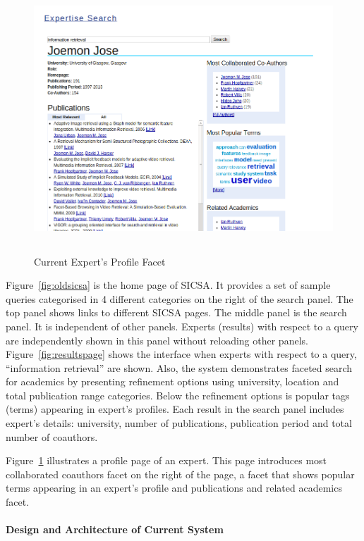  \begin{figure}
 \centering
 \includegraphics[width=13cm,height=10cm,keepaspectratio]{./figures/oldProfilePage.png}
 \caption{Current Expert's Profile Facet} \label{fig:profilepage} 
\end{figure}
Figure~\ref{fig:oldsicsa} is the home page of SICSA. It provides a set of sample queries categorised in 4 different categories on the right of the 
search panel. The top panel shows links to different SICSA pages. The middle panel is the search panel. It is independent of other panels. 
Experts (results) with respect to a query are independently shown in this panel without reloading other panels. Figure~\ref{fig:resultspage} shows
the interface when experts with respect to a query, ``information retrieval'' are shown. Also, the system demonstrates 
faceted search for academics by presenting refinement options using university, location and total publication range categories.
Below the refinement options is popular tags (terms) appearing in expert's profiles.
Each result in the search panel includes expert's details: university, number of publications, publication period and total number of coauthors.

Figure~\ref{fig:profilepage} illustrates a profile page of an expert. This page introduces most collaborated coauthors facet on the right of the page, a 
facet that shows popular terms appearing in an expert's profile and publications and related academics facet.

\paragraph{Design and Architecture of Current System} \hspace{0pt} \\

